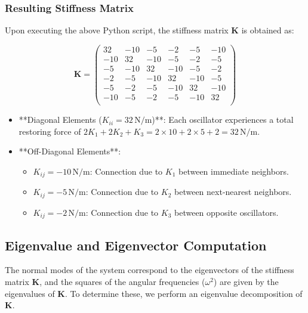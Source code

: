\documentclass[12pt]{report} %
\begin{document}
\subsubsection{Resulting Stiffness Matrix}
\label{subsubsec:part2_task2_K_matrix_result}

Upon executing the above Python script, the stiffness matrix \( \mathbf{K} \) is obtained as:

\[
\mathbf{K} =
\begin{pmatrix}
32 & -10 & -5 & -2 & -5 & -10 \\
-10 & 32 & -10 & -5 & -2 & -5 \\
-5 & -10 & 32 & -10 & -5 & -2 \\
-2 & -5 & -10 & 32 & -10 & -5 \\
-5 & -2 & -5 & -10 & 32 & -10 \\
-10 & -5 & -2 & -5 & -10 & 32 \\
\end{pmatrix}
\]

\begin{itemize}
    \item **Diagonal Elements (\( K_{ii} = 32 \, \text{N/m} \))**: Each oscillator experiences a total restoring force of \( 2K_1 + 2K_2 + K_3 = 2 \times 10 + 2 \times 5 + 2 = 32 \, \text{N/m} \).
    \item **Off-Diagonal Elements**:
    \begin{itemize}
        \item \( K_{ij} = -10 \, \text{N/m} \): Connection due to \( K_1 \) between immediate neighbors.
        \item \( K_{ij} = -5 \, \text{N/m} \): Connection due to \( K_2 \) between next-nearest neighbors.
        \item \( K_{ij} = -2 \, \text{N/m} \): Connection due to \( K_3 \) between opposite oscillators.
    \end{itemize}
\end{itemize}

\subsection{Eigenvalue and Eigenvector Computation}
\label{subsec:part2_task2_eigen}

The normal modes of the system correspond to the eigenvectors of the stiffness matrix \( \mathbf{K} \), and the squares of the angular frequencies (\( \omega^2 \)) are given by the eigenvalues of \( \mathbf{K} \). To determine these, we perform an eigenvalue decomposition of \( \mathbf{K} \).
\end{document}
